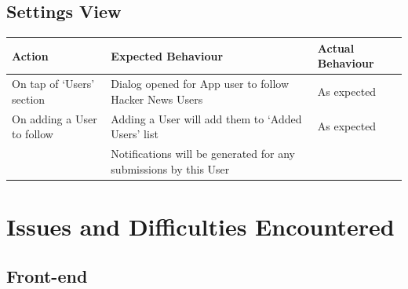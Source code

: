 \documentclass[11pt]{article}
\begin{document}
\subsection*{Settings View}
\begin{center}
\begin{tabular}{ | p{5cm} | p{5cm} | p{5cm} |}
	\hline
	\textbf{Action} & \textbf{Expected Behaviour} & \textbf{Actual Behaviour} \\
	\hline	
	On tap of ‘Users' section & Dialog opened for App user to follow Hacker News Users & As expected \\
	\hline
	On adding a User to follow & Adding a User will add them to ‘Added Users' list & As expected \\ & Notifications will be generated for any submissions by this User & \\
	\hline
\end{tabular}
\end{center}

\section*{Issues and Difficulties Encountered}

\subsection*{Front-end}
\end{document}
